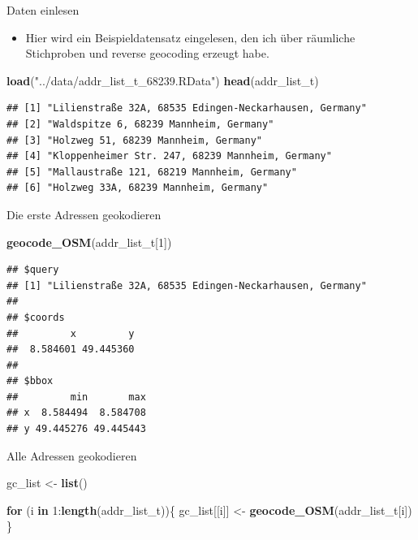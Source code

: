 \documentclass[ignorenonframetext,]{beamer}
\newenvironment{Shaded}{\begin{snugshade}}{\end{snugshade}}
\newcommand{\ControlFlowTok}[1]{\textcolor[rgb]{0.26,0.66,0.93}{\textbf{#1}}}
\newcommand{\DecValTok}[1]{\textcolor[rgb]{0.27,0.67,0.26}{#1}}
\newcommand{\KeywordTok}[1]{\textcolor[rgb]{0.26,0.66,0.93}{\textbf{#1}}}
\newcommand{\NormalTok}[1]{\textcolor[rgb]{0.74,0.68,0.62}{#1}}
\newcommand{\OperatorTok}[1]{\textcolor[rgb]{0.74,0.68,0.62}{#1}}
\newcommand{\StringTok}[1]{\textcolor[rgb]{0.02,0.61,0.04}{#1}}
\providecommand{\tightlist}{%
  \setlength{\itemsep}{0pt}\setlength{\parskip}{0pt}}
\begin{document}
\begin{frame}[fragile]{Daten einlesen}
\protect\hypertarget{daten-einlesen}{}

\begin{itemize}
\tightlist
\item
  Hier wird ein Beispieldatensatz eingelesen, den ich über räumliche
  Stichproben und reverse geocoding erzeugt habe.
\end{itemize}

\begin{Shaded}
\begin{Highlighting}[]
\KeywordTok{load}\NormalTok{(}\StringTok{"../data/addr_list_t_68239.RData"}\NormalTok{)}
\KeywordTok{head}\NormalTok{(addr_list_t)}
\end{Highlighting}
\end{Shaded}

\begin{verbatim}
## [1] "Lilienstraße 32A, 68535 Edingen-Neckarhausen, Germany"
## [2] "Waldspitze 6, 68239 Mannheim, Germany"                
## [3] "Holzweg 51, 68239 Mannheim, Germany"                  
## [4] "Kloppenheimer Str. 247, 68239 Mannheim, Germany"      
## [5] "Mallaustraße 121, 68219 Mannheim, Germany"            
## [6] "Holzweg 33A, 68239 Mannheim, Germany"
\end{verbatim}

\end{frame}

\begin{frame}[fragile]{Die erste Adressen geokodieren}
\protect\hypertarget{die-erste-adressen-geokodieren}{}

\begin{Shaded}
\begin{Highlighting}[]
\KeywordTok{geocode_OSM}\NormalTok{(addr_list_t[}\DecValTok{1}\NormalTok{])}
\end{Highlighting}
\end{Shaded}

\begin{verbatim}
## $query
## [1] "Lilienstraße 32A, 68535 Edingen-Neckarhausen, Germany"
## 
## $coords
##         x         y 
##  8.584601 49.445360 
## 
## $bbox
##         min       max
## x  8.584494  8.584708
## y 49.445276 49.445443
\end{verbatim}

\end{frame}

\begin{frame}[fragile]{Alle Adressen geokodieren}
\protect\hypertarget{alle-adressen-geokodieren}{}

\begin{Shaded}
\begin{Highlighting}[]
\NormalTok{gc_list <-}\StringTok{ }\KeywordTok{list}\NormalTok{()}

\ControlFlowTok{for}\NormalTok{ (i }\ControlFlowTok{in} \DecValTok{1}\OperatorTok{:}\KeywordTok{length}\NormalTok{(addr_list_t))\{}
\NormalTok{  gc_list[[i]] <-}\StringTok{ }\KeywordTok{geocode_OSM}\NormalTok{(addr_list_t[i])}
\NormalTok{\}}
\end{Highlighting}
\end{Shaded}

\end{frame}
\end{document}
